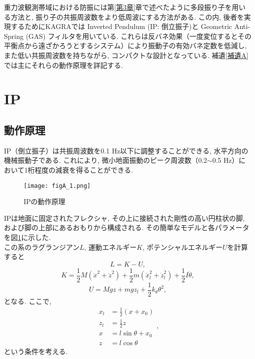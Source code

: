 重力波観測帯域における防振には第\ref{第3章}章で述べたように多段振り子を用いる方法と, 振り子の共振周波数をより低周波にする方法がある. この内, 後者を実現するためにKAGRAでは Inverted Pendulum (IP: 倒立振子)と Geometric Anti-Spring (GAS) フィルタを用いている. これらは反バネ効果（一度変位するとその平衡点から遠ざかろうとするシステム）により振動子の有効バネ定数を低減し, また低い共振周波数を持ちながら, コンパクトな設計となっている. 補遺\ref{補遺A}では主にそれらの動作原理を詳記する. 
\section{IP}
\subsection{動作原理}
IP（倒立振子）は共振周波数を0.1 Hz以下に調整することができる, 水平方向の機械振動子である. これにより, 微小地面振動のピーク周波数（0.2$\sim$0.5 Hz）において1桁程度の減衰を得ることができる. 
\begin{figure}[H]
\begin{center}
\texttt{[image: figA\_1.png]} 
\caption[IPの動作原理]{IPの動作原理}
\label{figA.1}
\end{center}
\end{figure}
IPは地面に固定されたフレクシャ, その上に接続された剛性の高い円柱状の脚, および脚の上部にあるおもりから構成される. その簡単なモデルと各パラメータを図\ref{figA.1}に示した. \\
この系のラグランジアン$L$, 運動エネルギー$K$, ポテンシャルエネルギー$U$を計算すると
\begin{equation}
L=K-U,
\end{equation}
\begin{equation}
K=\frac{1}{2}M\left(\dot{x}^2+\dot{z}^2\right)+\frac{1}{2}m\left(\dot{x}_l^2+\dot{z}_l^2\right)+\frac{1}{2}I\ddot{\theta},
\end{equation}
\begin{equation}
U=Mgz+mgz_l+\frac{1}{2}k_{\theta}\theta^2,
\end{equation}
となる. ここで, 
\begin{equation}
\begin{split}
x_l&=\frac{1}{2}(x+x_0)\\
z_l&=\frac{1}{2}z\\
x&=l\sin\theta+x_0\\
z&=l\cos\theta
\end{split},
\end{equation}
という条件を考える. 
